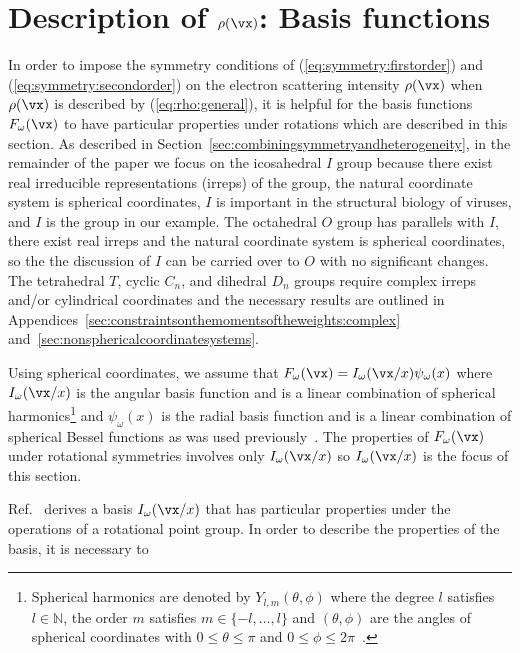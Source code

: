 \section{Description of $\rho(\vx)$: Basis functions}
\label{sec:BasisFunction}
In order to impose the symmetry conditions of
(\ref{eq:symmetry:firstorder}) and (\ref{eq:symmetry:secondorder}) on the
electron scattering intensity $\rho(\vx)$ when $\rho(\vx)$ is described by
(\ref{eq:rho:general}), it is helpful for the basis functions
$F_\omega(\vx)$ to have particular properties under rotations which are
described in this section.
As described in Section~\ref{sec:combiningsymmetryandheterogeneity}, in the
remainder of the paper we focus on the icosahedral $I$ group because
there exist real irreducible representations (irreps) of the group, the
natural coordinate system is spherical coordinates, $I$ is important in the
structural biology of viruses, and $I$ is the group in our example.
The octahedral $O$ group has parallels with $I$, there exist real irreps
and the natural coordinate system is spherical coordinates, so the the
discussion of $I$ can be carried over to $O$ with no significant changes.
The tetrahedral $T$, cyclic $C_n$, and dihedral $D_n$ groups require
complex irreps and/or cylindrical coordinates and the necessary results are
outlined in
Appendices~\ref{sec:constraintsonthemomentsoftheweights:complex}
and~\ref{sec:nonsphericalcoordinatesystems}.
\par
Using spherical coordinates, we assume that
$F_\omega(\vx)=I_\omega(\vx/x)\psi_\omega(x)$ where $I_\omega(\vx/x)$ is
the angular basis function and is a linear combination of spherical
harmonics\footnote{Spherical harmonics are denoted by
  $Y_{l,m}(\theta,\phi)$ where the degree $l$ satisfies $l\in\mathbb{N}$,
  the order $m$ satisfies $m\in\{-l,\dots,l\}$ and $(\theta,\phi)$ are the
  angles of spherical coordinates with $0\leq \theta\leq \pi$ and
  $0\leq\phi\leq 2\pi$~\cite[Section~14.30, pp.~378--379]{OlverLozierBoisvertClark2010}.}
and $\psi_\omega(x)$ is the radial basis function and is a linear
combination of spherical Bessel functions as was used
previously~\cite{DoerschukJohnsonIT2000}.
The properties of $F_\omega(\vx)$ under rotational symmetries involves only
$I_\omega(\vx/x)$ so $I_\omega(\vx/x)$ is the focus of this section.
\par
Ref.~\cite{XuDoerschukBasisFunctions2017} derives a basis $I_\omega(\vx/x)$
that has particular properties under the operations of a rotational point
group.
In order to describe the properties of the basis, it is necessary to
